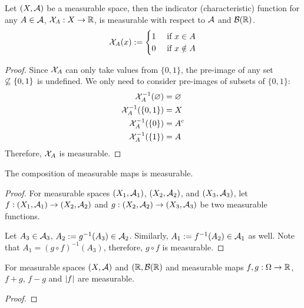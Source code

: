 \documentclass[11pt]{article}
\begin{document}
	\begin{theorem}
		Let $(X, \mathcal{{A}})$ be a measurable space, then the indicator (characteristic) function for any $A \in \mathcal{{A}}$, $\mathcal{{X}}_A: X \to \mathbb{R}$, is measurable with respect to $\mathcal{{A}}$ and $\mathcal{{B}}(\mathbb{R})$.
		\begin{align}
			\mathcal{{X}}_A(x) := \begin{cases}
				1 &\text{{ if }} x \in A \\
				0 &\text{{ if }} x \notin A
			\end{cases}
		\end{align}
	\end{theorem}
	
	\begin{proof}
		Since $\mathcal{{X}}_A$ can only take values from $\{0, 1\}$, the pre-image of any set $\centernot \subseteq \{0, 1\}$ is undefined.
		We only need to consider pre-images of subsets of $\{0, 1\}$:
		\begin{align}
			\mathcal{{X}}_A^{-1}(\varnothing) &= \varnothing \\
			\mathcal{{X}}_A^{-1}(\{0, 1\}) &= X \\
			\mathcal{{X}}_A^{-1}(\{0\}) &= A^c \\
			\mathcal{{X}}_A^{-1}(\{1\}) &= A
		\end{align}
		Therefore, $\mathcal{{X}}_A$ is measurable.
	\end{proof}
	
	\begin{theorem}
		The composition of measurable maps is measurable.
	\end{theorem}
	
	\begin{proof}
		For measurable spaces $(X_1, \mathcal{{A}}_1)$, $(X_2, \mathcal{{A}}_2)$, and $(X_3, \mathcal{{A}}_3)$, let $f: (X_1, \mathcal{{A}}_1) \to (X_2, \mathcal{{A}}_2)$ and $g: (X_2, \mathcal{{A}}_2) \to (X_3, \mathcal{{A}}_3)$ be two measurable functions.
		
		Let $A_3 \in \mathcal{{A}}_3$, $A_2 := g^{-1}(A_3) \in \mathcal{{A}}_2$. Similarly, $A_1 := f^{-1}(A_2) \in \mathcal{{A}}_1$ as well. Note that $A_1 = (g \circ f)^{-1}(A_3)$, therefore, $g \circ f$ is measurable.
	\end{proof}
	
	\begin{theorem}
		For measurable spaces $(X, \mathcal{{A}})$ and $(\mathbb{R}, \mathcal{{B}}(\mathbb{R})$ and measurable maps $f, g: \Omega \to \mathbb{R}$, $f + g$, $f - g$ and $\left \vert {f} \right \vert$ are measurable.
	\end{theorem}
	
	\begin{proof}
		
	\end{proof}
	
\end{document}
